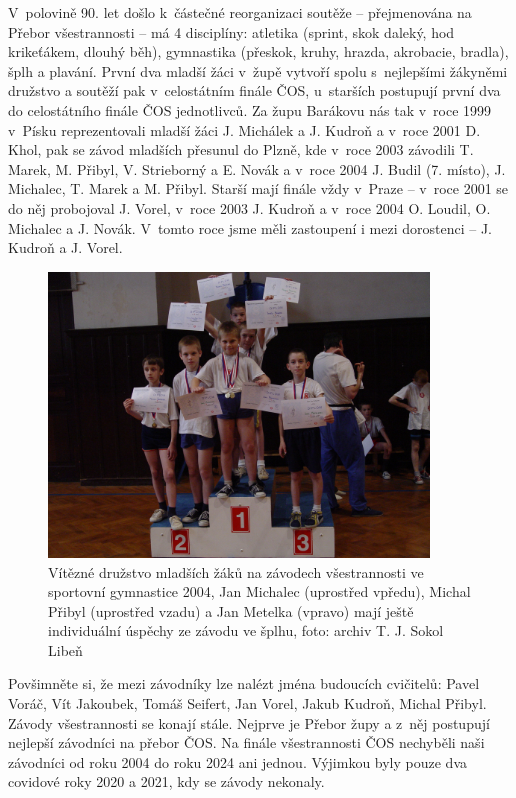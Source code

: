 \documentclass[a5paper, 11pt, twoside]{article}
\begin{document}
V~polovině 90. let došlo k~částečné reorganizaci soutěže -- přejmenována
na Přebor všestrannosti -- má 4 disciplíny: atletika (sprint, skok
daleký, hod krikeťákem, dlouhý běh), gymnastika (přeskok, kruhy, hrazda,
akrobacie, bradla), šplh a plavání. První dva mladší žáci v~župě vytvoří
spolu s~nejlepšími žákyněmi družstvo a soutěží pak v~celostátním finále
ČOS, u~starších postupují první dva do celostátního finále ČOS
jednotlivců. Za župu Barákovu nás tak v~roce 1999 v~Písku reprezentovali
mladší žáci J. Michálek a J. Kudroň a v~roce 2001 D. Khol, pak se závod
mladších přesunul do Plzně, kde v~roce 2003 závodili T. Marek, M.
Přibyl, V. Strieborný a E. Novák a v~roce 2004 J. Budil (7. místo), J.
Michalec, T. Marek a M. Přibyl. Starší mají finále vždy v~Praze --
v~roce 2001 se do něj probojoval J. Vorel, v~roce 2003 J. Kudroň a v~roce
2004 O. Loudil, O. Michalec a J. Novák. V~tomto roce jsme měli
zastoupení i mezi dorostenci -- J. Kudroň a J. Vorel.

\begin{figure}[h!]
  \centering 
  \includegraphics[width=0.9\textwidth]{img/42_vitezove_gumnastika.JPG}
  \caption*{Vítězné družstvo mladších žáků na závodech všestrannosti ve
  sportovní gymnastice 2004, Jan Michalec (uprostřed vpředu), Michal
  Přibyl (uprostřed vzadu) a Jan Metelka (vpravo) mají ještě individuální
  úspěchy ze závodu ve šplhu, foto: archiv T. J. Sokol Libeň}
\end{figure}

Povšimněte si, že mezi závodníky lze nalézt jména budoucích cvičitelů:
Pavel Voráč, Vít Jakoubek, Tomáš Seifert, Jan Vorel, Jakub Kudroň,
Michal Přibyl. Závody všestrannosti se konají stále. Nejprve je Přebor
župy a z~něj postupují nejlepší závodníci na přebor ČOS. Na finále
všestrannosti ČOS nechyběli naši závodníci od roku 2004 do roku 2024 ani
jednou. Výjimkou byly pouze dva covidové roky 2020 a 2021, kdy se závody
nekonaly.
\end{document}
